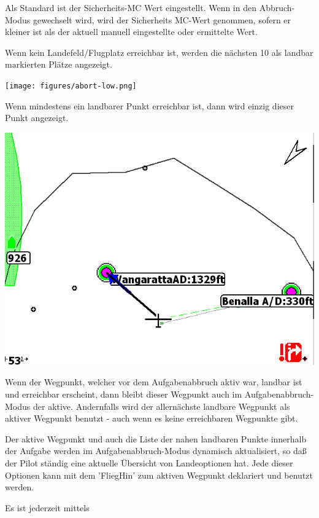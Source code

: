 Als Standard ist der Sicherheits-MC Wert eingestellt. 
Wenn in den Abbruch-Modus gewechselt wird, wird der Sicherheits MC-Wert genommen, sofern er kleiner ist als der aktuell
manuell eingestellte oder ermittelte Wert.

Wenn kein Landefeld/Flugplatz erreichbar ist, werden die nächsten 10 als landbar markierten Plätze angezeigt.

\begin{center}
\texttt{[image: figures/abort-low.png]}
\end{center}

Wenn mindestens ein landbarer Punkt erreichbar ist, dann wird einzig dieser Punkt angezeigt.

\begin{center}
\includegraphics[angle=0,width=0.8\linewidth,keepaspectratio='true']{figures/abort-high.png}
\end{center}

Wenn der Wegpunkt, welcher vor dem Aufgabenabbruch aktiv war, landbar ist und erreichbar erscheint,
dann bleibt dieser Wegpunkt auch im Aufgabenabbruch-Modus der aktive.
Andernfalls wird der allernächste landbare  Wegpunkt als aktiver Wegpunkt benutzt - auch wenn es
keine erreichbaren Wegpunkte gibt.

Der aktive  Wegpunkt und auch die Liste der nahen landbaren Punkte innerhalb der Aufgabe werden im Aufgabenabbruch-Modus dynamisch aktualisiert, so daß der Pilot ständig eine aktuelle Übersicht von Landeoptionen hat.  Jede dieser Optionen kann  mit dem 'FliegHin' zum aktiven Wegpunkt deklariert und benutzt werden.

Es ist jederzeit mittels

